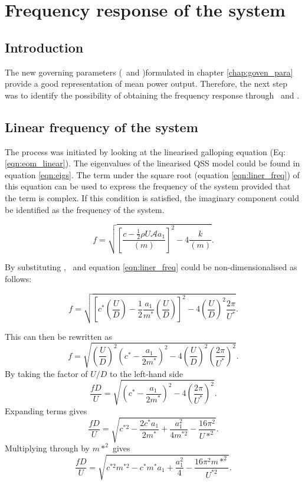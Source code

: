 \chapter{Frequency response of the system}

\section{Introduction}

The new governing parameters (\massstiff\ and \massdamp)formulated in chapter \ref{chap:goven_para} provide a good representation of mean power output. Therefore, the next step was to identify the possibility of obtaining the frequency response through \massstiff\ and \massdamp.


\section{Linear frequency of the system}

The process was initiated by looking at the linearised galloping equation (Eq:\ref{eqn:eom_linear}). The eigenvalues of the linearised QSS model could be found in equation \ref{eqn:eigs}. The term under the square root (equation \ref{eqn:liner_freq}) of this equation can be used to express the frequency of the system provided that the term is complex. If this condition is satisfied, the imaginary component could be identified as the frequency of the system. 

\begin{equation}
\label{eqn:liner_freq}
f = \sqrt{\left[\frac{c-\frac{1}{2}\rho U\mathcal{A}a_1}{(m)}\right]^2-4\frac{k}{(m)}}.
\end{equation}



By substituting \cstar, \mstar\ and \ustar equation \ref{eqn:liner_freq} could be non-dimensionalised as follows:

\begin{equation}
f = \sqrt{\left[c^*\left(\frac{U}{D}\right) - \frac{1}{2}\frac{a_1}{m^*}\left(\frac{U}{D}\right)\right]^2 - 4\left(\frac{U}{D}\right)^2\frac{2\pi}{U^*}}.
\end{equation}

This can then be rewritten as
\begin{equation}
f = \sqrt{\left(\frac{U}{D}\right)^2\left(c^*-\frac{a_1}{2m^*}\right)^2 - 4\left(\frac{U}{D}\right)^2\left(\frac{2\pi}{U^*}\right)^2}.
\end{equation}
By taking the factor of $U/D$ to the left-hand side
\begin{equation}
\frac{fD}{U} = \sqrt{\left(c^*-\frac{a_1}{2m^*}\right)^2 - 4\left(\frac{2\pi}{U^*}\right)^2}.
\end{equation}
Expanding terms gives
\begin{equation}
\frac{fD}{U} = \sqrt{c^{*2} - \frac{2c^*a_1}{2m^*} + \frac{a_1^2}{4m^{*2}} - \frac{16\pi^2}{U*^2}}.
\end{equation}
Multiplying through by $m*^2$ gives
\begin{equation}
\frac{fD}{U} = \sqrt{c^{*2}m^{*2} - c^*m^*a_1 + \frac{a_1^2}{4} - \frac{16\pi^2m{*^2}}{U^{*2}}}.
\end{equation}


